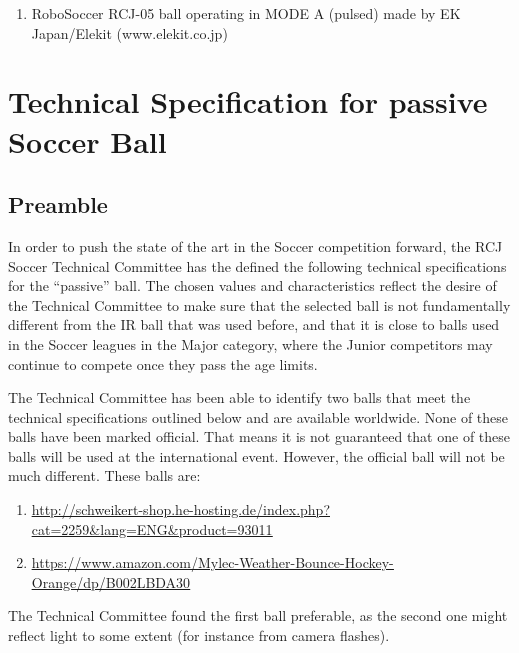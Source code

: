\documentclass{article}
\begin{document}
\begin{enumerate}
    \item RoboSoccer RCJ-05 ball operating in MODE A (pulsed) made by EK Japan/Elekit (www.elekit.co.jp)
\end{enumerate}

\section{Technical Specification for passive Soccer Ball\label{ref-passive-spec}}

\subsection{Preamble}

In order to push the state of the art in the Soccer competition forward, the RCJ Soccer Technical Committee has the defined the following technical specifications for the ``passive'' ball. The chosen values and characteristics reflect the desire of the Technical Committee to make sure that the selected ball is not fundamentally different from the IR ball that was used before, and that it is close to balls used in the Soccer leagues in the Major category, where the Junior competitors may continue to compete once they pass the age limits.

The Technical Committee has been able to identify two balls that meet the technical specifications outlined below and are available worldwide. None of these balls have been marked official. That means it is not guaranteed that one of these balls will be used at the international event. However, the official ball will not be much different. These balls are:

\begin{enumerate}

\item \underline{\href{http://schweikert-shop.he-hosting.de/index.php?cat=2259&lang=ENG&product=93011}{http://schweikert-shop.he-hosting.de/index.php?cat=2259\&lang=ENG\&product=93011}}

\item \underline{\href{https://www.amazon.com/Mylec-Weather-Bounce-Hockey-Orange/dp/B002LBDA30}{https://www.amazon.com/Mylec-Weather-Bounce-Hockey-Orange/dp/B002LBDA30}}

\end{enumerate}

The Technical Committee found the first ball preferable, as the second one might reflect light to some extent (for instance from camera flashes).
\end{document}
